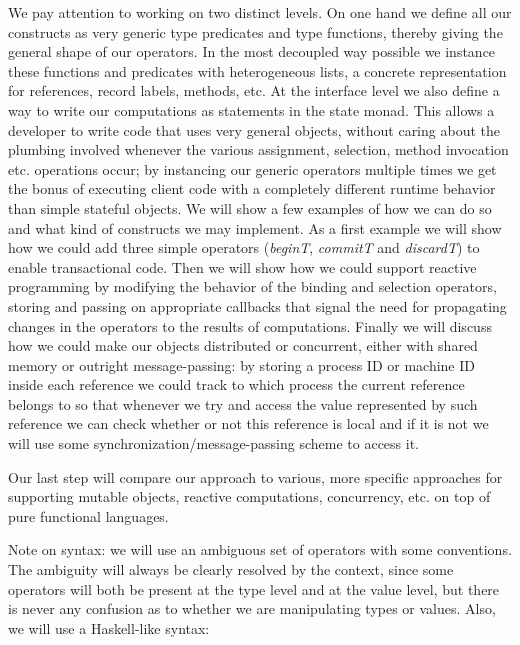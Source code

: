 \documentclass[a4paper]{article}
\begin{document}
 We pay attention to working on two distinct levels. On one hand we define all our constructs as very generic type predicates and type functions, thereby giving the general shape of our operators. In the most decoupled way possible we instance these functions and predicates with heterogeneous lists, a concrete representation for references, record labels, methods, etc. At the interface level we also define a way to write our computations as statements in the state monad. This allows a developer to write code that uses very general objects, without caring about the plumbing involved whenever the various assignment, selection, method invocation etc. operations occur; by instancing our generic operators multiple times we get the bonus of executing client code with a completely different runtime behavior than simple stateful objects. We will show a few examples of how we can do so and what kind of constructs we may implement. As a first example we will show how we could add three simple operators (\textit{beginT}, \textit{commitT} and \textit{discardT}) to enable transactional code. Then we will show how we could support reactive programming by modifying the behavior of the binding and selection operators, storing and passing on appropriate callbacks that signal the need for propagating changes in the operators to the results of computations. Finally we will discuss how we could make our objects distributed or concurrent, either with shared memory or outright message-passing: by storing a process ID or machine ID inside each reference we could track to which process the current reference belongs to so that whenever we try and access the value represented by such reference we can check whether or not this reference is local and if it is not we will use some synchronization/message-passing scheme to access it.

 Our last step will compare our approach to various, more specific approaches for supporting mutable objects, reactive computations, concurrency, etc. on top of pure functional languages.

 

 Note on syntax: we will use an ambiguous set of operators with some conventions. The ambiguity will always be clearly resolved by the context, since some operators will both be present at the type level and at the value level, but there is never any confusion as to whether we are manipulating types or values. Also, we will use a Haskell-like syntax:
\end{document}
